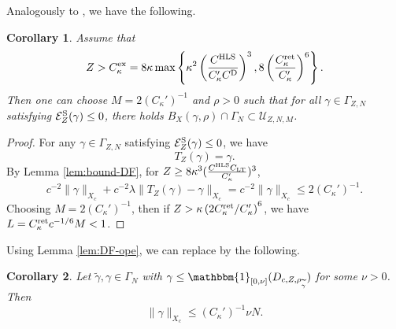 \documentclass[a4paper]{amsart}
\newtheorem{corollary}{Corollary}
\def\cE{{\mathcal E}}
\def\cU{{\mathcal U}}
\begin{document}
Analogously to \cite[Corollary 2.12]{Sere2023}, we have the
following.
\begin{corollary}
Assume that 
  \begin{align}
      Z> C_\kappa^{\rm ex}=8\kappa\max\left\{\kappa^2\left({ C^{\rm HLS}\over C_\kappa' C^{\rm D}}\right)^3, 8\left({ C_{\kappa}^{\rm ret}\over C_\kappa'}\right)^6\right\}.
  \end{align}
  Then one can choose $M=2(C_\kappa')^{-1}$ and $\rho>0$ such that for
  all $\gamma \in \Gamma_{Z,N}$ satisfying
  $ \cE_Z^{\rm S}(\gamma)\leq 0$, there holds
  $B_X(\gamma,\rho)\cap \Gamma_{N}\subset \cU_{Z,N,M}$.
\end{corollary}
\begin{proof}
   For any $\gamma \in \Gamma_{Z,N}$ satisfying $ \cE_Z^{\rm S}(\gamma)\leq 0$, we have
\begin{equation}
    T_Z(\gamma)=\gamma.
\end{equation}
By Lemma \ref{lem:bound-DF}, for
$Z\geq 8\kappa^3(\frac{C^{\rm HLS}C_{\rm LT}}{C_\kappa'} )^3$,
 \begin{equation}
     c^{-2} \|\gamma\|_{X_c}+c^{-2} \lambda\|T_Z(\gamma)-\gamma\|_{X_c}=  c^{-2} \|\gamma\|_{X_c}\leq 2(C_\kappa')^{-1}.
 \end{equation}
Choosing $M=2(C_\kappa')^{-1}$, then if $Z> \kappa\left(2C_{\kappa}^{\rm ret}/C_\kappa'\right)^6$, we have $L=C_{\kappa}^{\rm ret}c^{-1/6} M<1$.
\end{proof}


Using Lemma \ref{lem:DF-ope}, we can replace \cite[Lemma
3.2]{Sere2023} by the following.
\begin{corollary}
  Let $\widetilde{\gamma},\gamma\in \Gamma_{N}$ with
  $\gamma\leq\mathbbm{1}_{[0,\nu]}(D_{c,Z,\rho_{\widetilde{\gamma}}})$
  for some $\nu>0$. Then 
    \begin{equation}
      \|\gamma\|_{X_c}\leq (C_\kappa')^{-1}\nu N.
    \end{equation}
\end{corollary}
\end{document}
